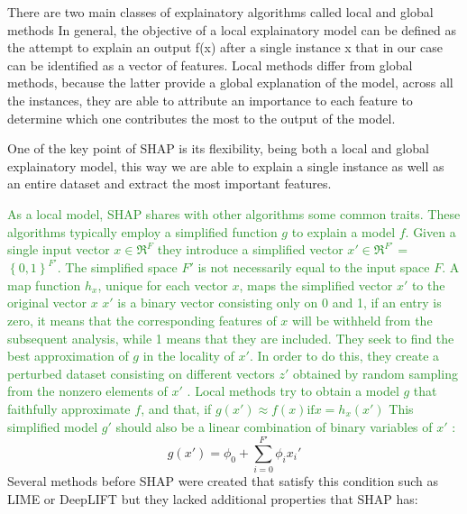 \documentclass[11pt]{report}
\begin{document}
There are two main classes of explainatory algorithms called local and global methods
In general, the objective of a local explainatory model can be defined as the attempt to explain an output f(x) after a single instance x that in our case can be identified as a vector of features.
Local methods differ from global methods, because the latter provide a global explanation of the model, across all the instances, they are able to attribute an importance to each feature to determine which one contributes the most to the output of the model.

One of the key point of SHAP is its flexibility, being both a local and global explainatory model, this way we are able to explain a single instance as well as an entire dataset and extract the most important features.


\textcolor{ForestGreen}{
As a local model, SHAP shares with other algorithms some common traits.
These algorithms typically employ a simplified function $g$ to explain a model $f$.
Given a single input vector $x \in \Re^F$ they introduce a simplified vector $x'\in \Re^{F'}$ = $\left\{ 0, 1 \right\}^{F'}$. The simplified space $F'$ is not necessarily equal to the input space $F$. A map function $h_x$, unique for each vector $x$, maps the simplified vector $x'$ to the original vector $x$
$x'$ is a binary vector consisting only on 0 and 1, if an entry is zero, it means that the corresponding features of $x$ will be withheld from the subsequent analysis, while 1 means that they are included.
They seek to find the best approximation of $g$ in the locality of $x'$. In order to do this, they create a perturbed dataset consisting on different vectors $z'$ obtained by random sampling from the nonzero elements of $x'$ \cite{ribeiro-2016}.
Local methods try to obtain a model $g$ that faithfully approximate $f$, and that, if  $g(x') \approx f(x) \text{if} x = h_x(x')$
This simplified model $g'$ should also be a linear combination of binary variables of $x'$ \cite{lundberg-2017}:
}
\begin{equation}
\label{eq:shap_g}
g(x') = \phi_0 + \sum_{i = 0}^{F'} \phi_i x_i'
\end{equation}
Several methods before SHAP were created that satisfy this condition such as LIME \cite{ribeiro-2016} or DeepLIFT \cite{shrikumar-2017} but they lacked additional properties that SHAP has:
\end{document}
